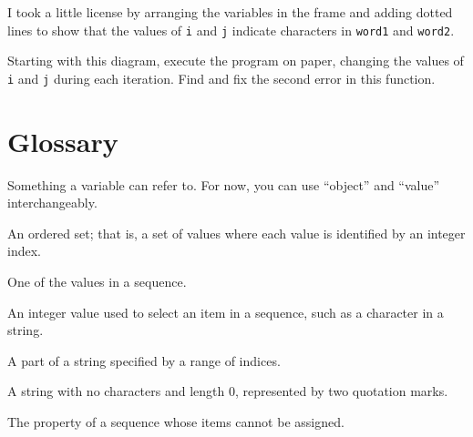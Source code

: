 I took a little license by arranging the variables in the frame
and adding dotted lines to show that the values of {\tt i} and
{\tt j} indicate characters in {\tt word1} and {\tt word2}.

\begin{exercise}
\label{is_reverse}
Starting with this diagram, execute the program on paper, changing the
values of {\tt i} and {\tt j} during each iteration.  Find and fix the
second error in this function.
\end{exercise}



\section{Glossary}
	
\begin{vocabulary}[object:] Something a variable can refer to.  For now,
you can use ``object'' and ``value'' interchangeably.
\end{vocabulary}
	
\begin{vocabulary}[sequence:] An ordered set; that is, a set of
values where each value is identified by an integer index.
\end{vocabulary}
	
\begin{vocabulary}[item:] One of the values in a sequence.
\end{vocabulary}
	
\begin{vocabulary}[index:] An integer value used to select an item in
a sequence, such as a character in a string.
\end{vocabulary}
	
\begin{vocabulary}[slice:] A part of a string specified by a range of indices.
\end{vocabulary}
	
\begin{vocabulary} A string with no characters and length 0, represented
by two quotation marks.
\end{vocabulary}
	
\begin{vocabulary}[immutable:] The property of a sequence whose items cannot
be assigned.
\end{vocabulary}
	
